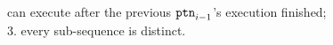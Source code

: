 can execute
after the previous $\mathtt{ptn}_{i - 1}$'s execution finished;
\\
3. every sub-sequence is distinct.
%

